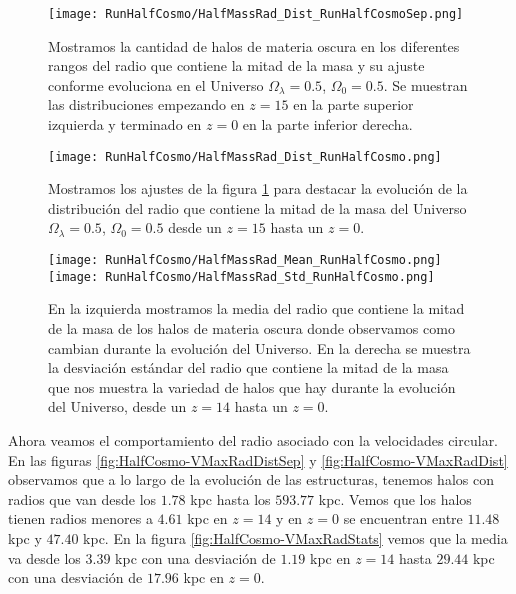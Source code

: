 \begin{figure}[H]
    \centering
    \texttt{[image: RunHalfCosmo/HalfMassRad\_Dist\_RunHalfCosmoSep.png]}
    \caption[Radio que contiene la mitad de la masa]{\footnotesize Mostramos la cantidad de halos de materia oscura en los diferentes rangos del radio que contiene la mitad de la masa y su ajuste conforme evoluciona en el Universo $\Omega_\lambda = 0.5 $, $\Omega_0 = 0.5$. Se muestran las distribuciones empezando en $z=15$ en la parte superior izquierda y terminado en $z=0$ en la parte inferior derecha.}
    \label{fig:HalfCosmo-HalfMassRadDistSep}
\end{figure}

\begin{figure}[H]
    \centering
    \texttt{[image: RunHalfCosmo/HalfMassRad\_Dist\_RunHalfCosmo.png]}
    \caption[Distribución del Radio que contiene la mitad de la masa]{\footnotesize Mostramos los ajustes de la figura \ref{fig:HalfCosmo-HalfMassRadDistSep} para destacar la evolución de la distribución del radio que contiene la mitad de la masa del Universo $\Omega_\lambda = 0.5 $, $\Omega_0 = 0.5$ desde un $z=15$ hasta un $z=0$.}
    \label{fig:HalfCosmo-HalfMassRadDist}
\end{figure}

\begin{figure}[H]
    \centering
    \texttt{[image: RunHalfCosmo/HalfMassRad\_Mean\_RunHalfCosmo.png]}
    \texttt{[image: RunHalfCosmo/HalfMassRad\_Std\_RunHalfCosmo.png]}
    \caption[Media y desviación estándar del radio de la mitad de la masa]{\footnotesize En la izquierda mostramos la media del radio que contiene la mitad de la masa de los halos de materia oscura donde observamos como cambian durante la evolución del Universo. En la derecha se muestra la desviación estándar del radio que contiene la mitad de la masa que nos muestra la variedad de halos que hay durante la evolución del Universo, desde un $z=14$ hasta un $z=0$.}
    \label{fig:HalfCosmo-HalfMassRadStats}
\end{figure}

Ahora veamos el comportamiento del radio asociado con la velocidades circular. En las figuras \ref{fig:HalfCosmo-VMaxRadDistSep} y \ref{fig:HalfCosmo-VMaxRadDist} observamos que a lo largo de la evolución de las estructuras, tenemos halos con radios que van desde los $1.78$ kpc hasta los $593.77$ kpc. Vemos que los halos tienen radios menores a $4.61$ kpc en $z=14$ y en $z=0$ se encuentran entre $11.48$ kpc y $47.40$ kpc. En la figura \ref{fig:HalfCosmo-VMaxRadStats} vemos que la media va desde los $3.39$ kpc con una desviación de $1.19$ kpc en $z=14$ hasta $29.44$ kpc con una desviación de $17.96$ kpc en $z=0$.

